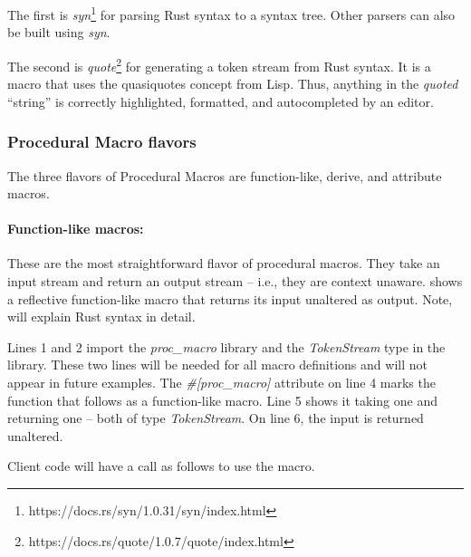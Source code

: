 The first is \textit{syn}\footnote{https://docs.rs/syn/1.0.31/syn/index.html} for parsing Rust syntax to a syntax tree.
Other parsers can also be built using \textit{syn}.

The second is \textit{quote}\footnote{https://docs.rs/quote/1.0.7/quote/index.html} for generating a token stream from Rust syntax.
It is a macro that uses the quasiquotes concept from Lisp.
Thus, anything in the \textit{quoted} ``string'' is correctly highlighted, formatted, and autocompleted by an editor.

\subsubsection{Procedural Macro flavors}
\label{sec:procedural-macro-flavors}

\newcommand{\functionh}[1]{\highlight[Yellow!100!]{#1}}
\newcommand{\inputh}[1]{\highlight[Blue!40!]{#1}}
\newcommand{\outputh}[1]{\highlight[Green!40!]{#1}}
\newcommand{\contexth}[1]{\highlight[Red!40!]{#1}}

The three flavors of Procedural Macros are function-like, derive, and attribute macros.

\paragraph{Function-like macros:}
\label{sec:function-like-macro}
These are the most straightforward flavor of procedural macros.
They take an input stream and return an output stream -- i.e., they are context unaware.
 shows a reflective function-like macro that returns its input unaltered as output.
Note,  will explain Rust syntax in detail.


Lines 1 and 2 import the \textit{proc\_macro} library and the \textit{TokenStream} type in the library.
These two lines will be needed for all macro definitions and will not appear in future examples.
The \textit{\#[proc\_macro]} attribute on line 4 marks the function that follows as a function-like macro.
Line 5 shows it taking one \inputh{input} and returning one \outputh{output} -- both of type \textit{TokenStream}.
On line 6, the input is returned unaltered.

Client code will have a call as follows to use the macro.


